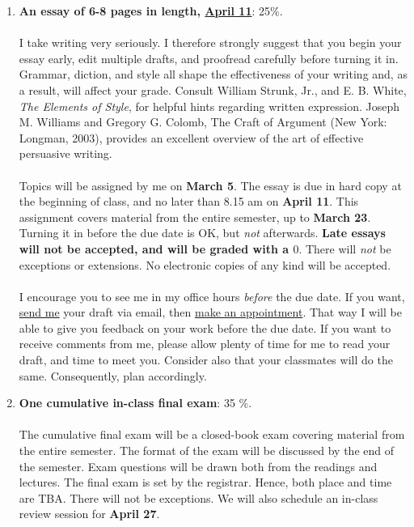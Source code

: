 \documentclass[letterpaper]{article}
\begin{document}
\begin{enumerate}
	\item {\bf An essay of 6-8 pages in length, \underline{April 11}}: 25\%. 
	\\
	\\
	I take writing very seriously. I therefore strongly suggest that you begin your essay early, edit multiple drafts, and proofread carefully before turning it in. Grammar, diction, and style all shape the effectiveness of your writing and, as a result, will affect your grade. Consult William Strunk, Jr., and E. B. White, \emph{The Elements of Style}, for helpful hints regarding written expression. Joseph M. Williams and Gregory G. Colomb, The Craft of Argument (New York: Longman, 2003), provides an excellent overview of the art of effective persuasive writing.
	\\
	\\
	Topics will be assigned by me on {\bf March 5}. The essay is due in hard copy at the beginning of class, and no later than 8.15 am on {\bf April 11}. This assignment covers material from the entire semester, up to {\bf March 23}. Turning it in before the due date is OK, but \emph{not} afterwards. {\bf Late essays will not be accepted, and will be graded with a $0$}. There will \emph{not} be exceptions or extensions. No electronic copies of any kind will be accepted.
	\\
	\\
	I encourage you to see me in my office hours \emph{before} the due date. If you want, \href{mailto:\filetext}{send me} your draft via email, then \href{https://calendly.com/bahamonde/officehours}{make an appointment}. That way I will be able to give you feedback on your work before the due date. If you want to receive comments from me, please allow plenty of time for me to read your draft, and time to meet you. Consider also that your classmates will do the same. Consequently, plan accordingly.

	\item {\bf One cumulative in-class final exam}: 35 \%. 
	\\
	\\
	The cumulative final exam will be a closed-book exam covering material from the entire semester. The format of the exam will be discussed by the end of the semester. Exam questions will be drawn both from the readings and lectures. The final exam is set by the registrar. Hence, both place and time are TBA. There will not be exceptions. We will also schedule an in-class review session for {\bf April 27}.

\end{enumerate}
\end{document}
